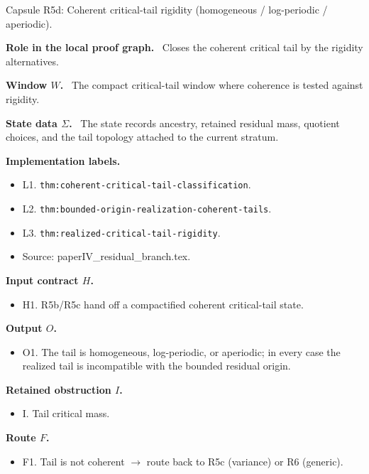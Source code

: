 \documentclass[11pt]{amsart}
\newcommand{\capsulefield}[1]{\par\smallskip\noindent\textbf{#1.}\ }
\begin{document}
\begin{proofcapsule}{Capsule R5d: Coherent critical-tail rigidity (homogeneous / log-periodic / aperiodic).}
  \capsulefield{Role in the local proof graph}
  Closes the coherent critical tail by the rigidity alternatives.

  \capsulefield{Window \(W\)}
The compact critical-tail window where coherence is tested against rigidity.

  \capsulefield{State data \(\Sigma\)}
The state records ancestry, retained residual mass, quotient choices, and the tail topology attached to the current stratum.

  \capsulefield{Implementation labels}
  \begin{itemize}[leftmargin=1.8em]
  \item L1. \texttt{thm:coherent-critical-tail-classification}.
  \item L2. \texttt{thm:bounded-origin-realization-coherent-tails}.
  \item L3. \texttt{thm:realized-critical-tail-rigidity}.
  \item Source: paperIV\_residual\_branch.tex.
  \end{itemize}

  \capsulefield{Input contract \(H\)}
  \begin{itemize}[leftmargin=1.8em]
  \item H1. R5b/R5c hand off a compactified coherent critical-tail state.
  \end{itemize}

  \capsulefield{Output \(O\)}
  \begin{itemize}[leftmargin=1.8em]
  \item O1. The tail is homogeneous, log-periodic, or aperiodic; in every case the realized tail is incompatible with the bounded residual origin.
  \end{itemize}

  \capsulefield{Retained obstruction \(I\)}
  \begin{itemize}[leftmargin=1.8em]
  \item I. Tail critical mass.
  \end{itemize}

  \capsulefield{Route \(F\)}
  \begin{itemize}[leftmargin=1.8em]
  \item F1. Tail is not coherent $\to$ route back to R5c (variance) or R6 (generic).
  \end{itemize}


\end{proofcapsule}
\end{document}
